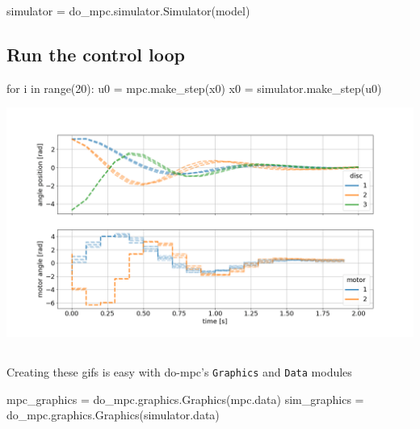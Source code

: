 \documentclass[
  letterpaper,
  DIV=11,
  numbers=noendperiod,
  oneside]{scrartcl}
\newenvironment{Shaded}{\begin{snugshade}}{\end{snugshade}}
\newcommand{\BuiltInTok}[1]{\textcolor[rgb]{0.00,0.23,0.31}{#1}}
\newcommand{\ControlFlowTok}[1]{\textcolor[rgb]{0.00,0.23,0.31}{#1}}
\newcommand{\DecValTok}[1]{\textcolor[rgb]{0.68,0.00,0.00}{#1}}
\newcommand{\KeywordTok}[1]{\textcolor[rgb]{0.00,0.23,0.31}{#1}}
\newcommand{\NormalTok}[1]{\textcolor[rgb]{0.00,0.23,0.31}{#1}}
\newcommand{\OperatorTok}[1]{\textcolor[rgb]{0.37,0.37,0.37}{#1}}
\begin{document}
\begin{Shaded}
\begin{Highlighting}[]
\NormalTok{simulator }\OperatorTok{=}\NormalTok{ do\_mpc.simulator.Simulator(model)}
\end{Highlighting}
\end{Shaded}

\subsection{Run the control loop}\label{run-the-control-loop}

\begin{Shaded}
\begin{Highlighting}[]
\ControlFlowTok{for}\NormalTok{ i }\KeywordTok{in} \BuiltInTok{range}\NormalTok{(}\DecValTok{20}\NormalTok{):}
\NormalTok{    u0 }\OperatorTok{=}\NormalTok{ mpc.make\_step(x0)}
\NormalTok{    x0 }\OperatorTok{=}\NormalTok{ simulator.make\_step(u0)}
\end{Highlighting}
\end{Shaded}

\begin{center}
\includegraphics{figs/anim_disc.gif}
\end{center}

\subsection{}\label{section-36}

Creating these gifs is easy with do-mpc's \texttt{Graphics} and
\texttt{Data} modules

\begin{Shaded}
\begin{Highlighting}[]
\NormalTok{mpc\_graphics }\OperatorTok{=}\NormalTok{ do\_mpc.graphics.Graphics(mpc.data)}
\NormalTok{sim\_graphics }\OperatorTok{=}\NormalTok{ do\_mpc.graphics.Graphics(simulator.data)}
\end{Highlighting}
\end{Shaded}
\end{document}
